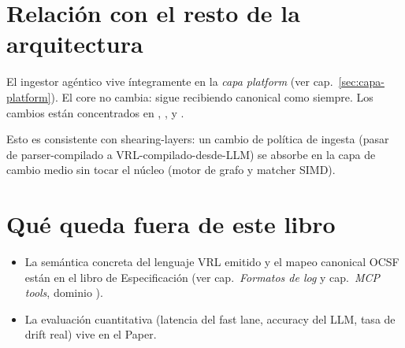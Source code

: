 \section{Relación con el resto de la arquitectura}

El ingestor agéntico vive íntegramente en la \emph{capa platform}
(ver cap.~\ref{sec:capa-platform}). El core no cambia: sigue
recibiendo  canonical como siempre. Los cambios están
concentrados en ,
,
 y
.

Esto es consistente con shearing-layers: un cambio de política de
ingesta (pasar de parser-compilado a VRL-compilado-desde-LLM) se
absorbe en la capa de cambio medio sin tocar el núcleo (motor de
grafo y matcher SIMD).

\section{Qué queda fuera de este libro}

\begin{itemize}
    \item La semántica concreta del lenguaje VRL emitido y el
    mapeo canonical OCSF están en el libro de Especificación
    (ver cap.\ \emph{Formatos de log} y cap.\ \emph{MCP tools},
    dominio ).
    \item La evaluación cuantitativa (latencia del fast lane,
    accuracy del LLM, tasa de drift real) vive en el Paper.
\end{itemize}
